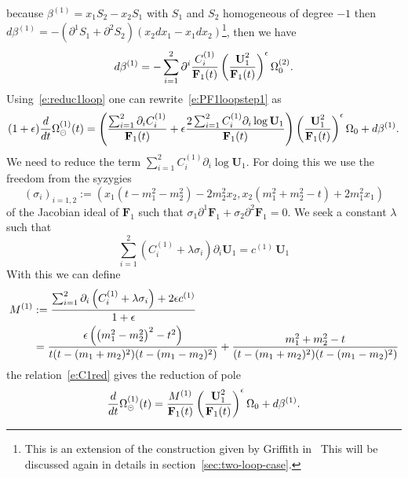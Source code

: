 \documentclass[a4paper,12pt]{article}
\numberwithin{equation}{section}
\numberwithin{figure}{subsection}
\theoremstyle{plain}
\theoremstyle{plain}
\theoremstyle{definition}
\theoremstyle{plain}
\theoremstyle{remark}
\theoremstyle{plain}
\def\su{\circleddash}
\begin{document}
because $\beta^{(1)}= x_1 S_2-  x_2 S_1$ with $S_1$ and $S_2$ homogeneous
of degree $-1$ then $d\beta^{(1)}=- (\partial^1 S_1+\partial^2 S_2)
(x_2dx_1- x_1dx_2)$\footnote{This is an extension of the
  construction given by Griffith in~\cite{Griffiths_1969} This will be
  discussed again in details in section~\ref{sec:two-loop-case}.}, then we have 
\begin{equation}
  d\beta^{(1)}=- \sum_{i=1}^2 \partial^i  { C_i^{(1)}  \over
    \textbf{F}_1(t) } \left(\textbf{U}_1^2\over
    \textbf{F}_1(t)\right)^\epsilon\Omega_0^{(2)}.
\end{equation}
Using~\eqref{e:reduc1loop} one can rewrite~\eqref{e:PF1loopstep1} as
\begin{equation}
(1+\epsilon) {d\over dt}
 \Omega^{(1)}_\su(t)=
 \left({\sum_{i=1}^2 \partial_i C_i^{(1)}\over
     \textbf{F}_1(t)}+\epsilon{2\sum_{i=1}^2 C_i^{(1)}\partial_i
     \log \textbf{U}_1\over \textbf{F}_1(t)}\right)\left(\textbf{U}_1^2\over \textbf{F}_1(t)\right)^\epsilon \Omega_0+d\beta^{(1)}.
\end{equation}
We need to reduce the term $\sum_{i=1}^2 C_i^{(1)}\partial_i
     \log \textbf{U}_1$. For doing this we use the freedom from the
     syzygies
     \begin{equation}
       (\sigma_i)_{i=1,2}:=(x_1 \left(t-m_{1}^2-m_{2}^2\right)-2 m_{2}^2 x_2,x_2
       \left(m_{1}^2+m_{2}^2-t\right)+2 m_{1}^2 x_1)
     \end{equation}
     of the Jacobian ideal
   of $\textbf{F}_1$ such that $\sigma_1 \partial^1
   \textbf{F}_1+\sigma_2\partial^2 \textbf{F}_1=0$.
We seek a constant $\lambda$ such that
\begin{equation}\label{e:C1red}
  \sum_{i=1}^2 \left(C_i^{(1)}+ \lambda
      \sigma_i
  \right)  \partial_i \textbf{U}_1 = c^{(1)}\, \textbf{U}_1
\end{equation}
%
With this we can define 
\begin{align}
  \label{e:M1}
  M^{(1)}&:={\sum_{i=1}^2 \partial_i \left(C_i^{(1)}+\lambda
      \sigma_i
  \right) +2\epsilon
  c^{(1)}\over 1+\epsilon}\\
\nonumber &=\frac{\epsilon  \left(\left(m_{1}^2-m_{2}^2\right)^2-t^2\right)}{t
  (t-(m_1+m_2)^2)(t-(m_1-m_2)^2)}+\frac{m_{1}^2+m_{2}^2-t}{ (t-(m_1+m_2)^2)(t-(m_1-m_2)^2)}
\end{align}
the relation~\eqref{e:C1red} gives the reduction of pole
\begin{equation}
 {d\over dt}
 \Omega^{(1)}_\su(t)=
{M^{(1)}\over
    \textbf{F}_1(t)}\left(\textbf{U}_1^2\over \textbf{F}_1(t)\right)^\epsilon \Omega_0+d\beta^{(1)}.
\end{equation}
\end{document}
